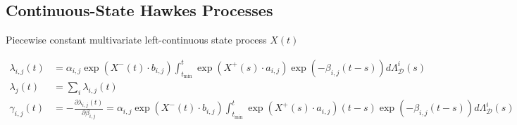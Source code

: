 \documentclass[honours,12pt]{unswthesis}
\numberwithin{equation}{section}
\begin{document}
\subsection{Continuous-State Hawkes Processes}

Piecewise constant multivariate left-continuous state process $X(t)$

\begin{equation*}
	\begin{align}
		\lambda_{i,j}(t) &= \alpha_{i,j} \exp(X^-(t)\cdot b_{i,j})\int_{t_\mathrm{min}}^t \exp(X^+(s)\cdot a_{i,j}) \exp(-\beta_{i,j}(t-s)) d\Lambda_\mathcal{D}^i(s) \\
		\lambda_j(t) &= \sum_i \lambda_{i,j}(t) \\
		\gamma_{i,j}(t) &= -\frac{\partial\lambda_{i,j}(t)}{\partial\beta_{i,j}} = \alpha_{i,j} \exp(X^-(t)\cdot b_{i,j})\int_{t_\mathrm{min}}^t \exp(X^+(s)\cdot a_{i,j}) (t-s)\exp(-\beta_{i,j}(t-s)) d\Lambda_\mathcal{D}^i(s) \\
	\end{align}
\end{equation*}
\end{document}
